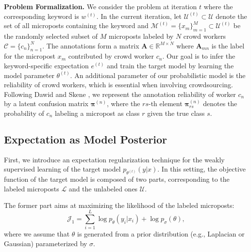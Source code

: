 \documentclass[letterpaper]{article}
\begin{document}
\smallskip
\noindent \textbf{Problem Formalization.} We consider the problem at iteration $t$ where the corresponding keyword is $w^{(t)}$. In the current iteration, let $\mathcal{U}^{(t)} \subset \mathcal{U}$ denote the set of all microposts containing the keyword and $\mathcal{M}^{(t)}= \{x_{m}\}_{m=1}^M\subset \mathcal{U}^{(t)}$ be the randomly selected subset of $M$ microposts labeled by $N$ crowd workers $\mathcal{C} = \{c_n\}_{n=1}^N$. The annotations form a matrix $\mathbf{A}\in \mathbb{R}^{M\times N}$ where $\mathbf{A}_{mn}$ is the label for the micropost $x_m$ contributed by crowd worker $c_n$. Our goal is to infer the keyword-specific expectation $e^{(t)}$ and train the target model by learning the model parameter $\theta^{(t)}$. An additional parameter of our probabilistic model is the reliability of crowd workers, which is essential when involving crowdsourcing. Following Dawid and Skene  \cite{dawid1979maximum,zheng2017truth}, we represent the annotation reliability of worker $c_n$ by a latent confusion matrix $\boldsymbol{\pi}^{(n)}$, where the $rs$-th element $\boldsymbol{\pi}_{rs}^{(n)}$ denotes the probability of $c_n$ labeling a micropost as class $r$ given the true class $s$.

\subsection{Expectation as Model Posterior}
First, we introduce an expectation regularization technique for the weakly supervised learning of the target model $p_{\theta^{(t)}}(y|x)$. In this setting, the objective function of the target model is composed of two parts, corresponding to the labeled microposts $\mathcal{L}$ and the unlabeled ones $\mathcal{U}$.

The former part aims at maximizing the likelihood of the labeled microposts:
\begin{equation}
    \mathcal{J}_1 = \sum_{i=1}^L \log p_\theta(y_i | x_i) + \log p_\sigma(\theta),
\end{equation}
where we assume that $\theta$ is generated from a prior distribution (e.g., Laplacian or Gaussian) parameterized by $\sigma$.
\end{document}
